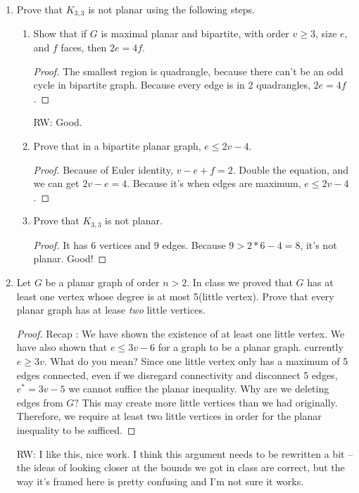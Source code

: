 \documentclass[11pt]{article}
\begin{document}
    \begin{enumerate}[leftmargin=*]
        
        \item Prove that $K_{3,3}$ is not planar using the following steps. 
        \begin{enumerate}
            \item Show that if $G$ is maximal planar and bipartite, with order $v \geq 3$, size $e$, and $f$ faces, then $2e=4f$. 
            \begin{proof}
                The smallest region is quadrangle, because there can't be an odd cycle in bipartite graph. Because every edge is in 2 quadrangles, $2e=4f$.
            \end{proof} \color{blue} RW: Good. \color{black}
            \item Prove that in a bipartite planar graph, $e \leq 2v-4$. 
            \begin{proof}
                Because of Euler identity, $v-e+f=2$. Double the equation, and we can get $2v-e=4$. Because it's when edges are maximum, $e \le 2v-4$.
            \end{proof}
            \item Prove that $K_{3,3}$ is not planar. 
            \begin{proof}
                It has 6 vertices and 9 edges. Because $9 > 2 * 6 - 4 = 8$, it's not planar. \color{red}Good!\color{black}
            \end{proof}
        \end{enumerate}
        \item Let $G$ be a planar graph of order $n>2$. In class we proved that $G$ has at least one vertex whose degree is at most 5(little vertex). Prove that every planar graph has at lease \textit{two} little vertices. 
        \begin{proof}
            Recap : We have shown the existence of at least one little vertex. We have also shown that $e \leq 3v-6$ for a graph to be a planar graph. currently $e \geq 3v$. \color{red}What do you mean?\color{black} Since one little vertex only has a maximum of 5 edges connected, even if we disregard connectivity and disconnect 5 edges, $e^*=3v-5$ we cannot suffice the planar inequality. \color{red}Why are we deleting edges from $G?$ This may create more little vertices than we had originally.\color{black} Therefore, we require at least two little vertices in order for the planar inequality to be sufficed. 
        \end{proof}   \color{blue} RW: I like this, nice work. \color{black} \color{red}I think this argument needs to be rewritten a bit -- the ideas of looking closer at the bounds we got in class are correct, but the way it's framed here is pretty confusing and I'm not sure it works.\color{black}

\end{enumerate}
\end{document}
